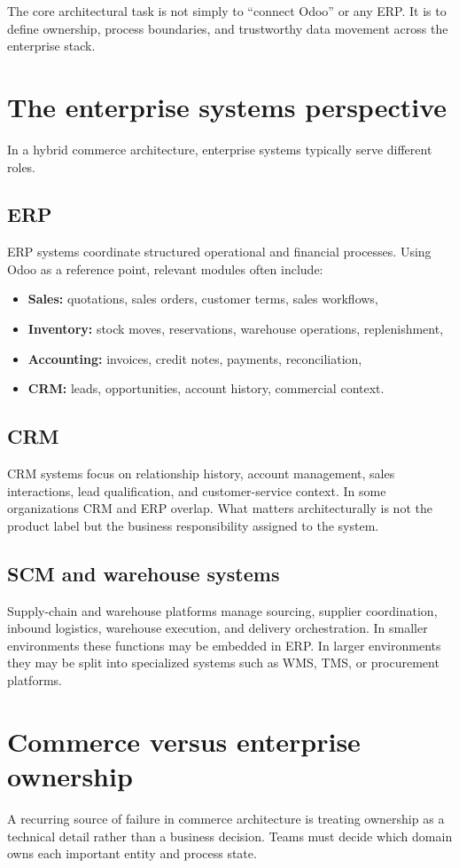 The core architectural task is not simply to ``connect Odoo'' or any ERP.
It is to define ownership, process boundaries, and trustworthy data movement across the enterprise stack.

\section{The enterprise systems perspective}
In a hybrid commerce architecture, enterprise systems typically serve different roles.

\subsection{ERP}
ERP systems coordinate structured operational and financial processes.
Using Odoo as a reference point, relevant modules often include:
\begin{itemize}
  \item \textbf{Sales:} quotations, sales orders, customer terms, sales workflows,
  \item \textbf{Inventory:} stock moves, reservations, warehouse operations, replenishment,
  \item \textbf{Accounting:} invoices, credit notes, payments, reconciliation,
  \item \textbf{CRM:} leads, opportunities, account history, commercial context.
\end{itemize}

\subsection{CRM}
CRM systems focus on relationship history, account management, sales interactions, lead qualification, and customer-service context.
In some organizations CRM and ERP overlap.
What matters architecturally is not the product label but the business responsibility assigned to the system.

\subsection{SCM and warehouse systems}
Supply-chain and warehouse platforms manage sourcing, supplier coordination, inbound logistics, warehouse execution, and delivery orchestration.
In smaller environments these functions may be embedded in ERP.
In larger environments they may be split into specialized systems such as WMS, TMS, or procurement platforms.

\section{Commerce versus enterprise ownership}
A recurring source of failure in commerce architecture is treating ownership as a technical detail rather than a business decision.
Teams must decide which domain owns each important entity and process state.

